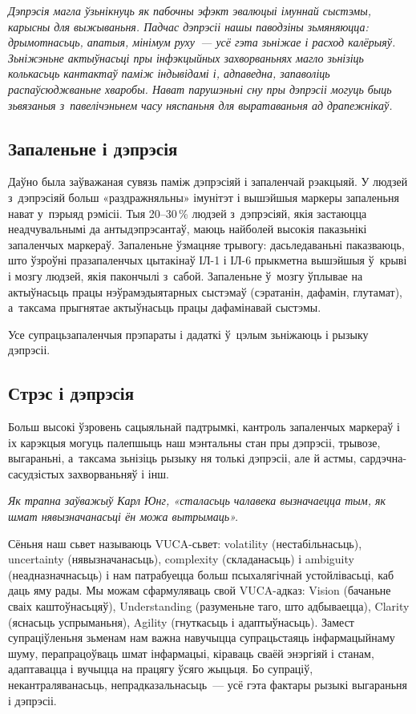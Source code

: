 \emph{Дэпрэсія магла ўзьнікнуць як пабочны эфэкт эвалюцыі імуннай сыстэмы, карысны для выжываньня. Падчас дэпрэсіі нашы паводзіны зьмяняюцца: дрымотнасьць, апатыя, мінімум руху~--- усё гэта зьніжае і расход калёрыяў. Зьніжэньне актыўнасьці пры інфэкцыйных захворваньнях магло зьнізіць колькасьць кантактаў паміж індывідамі і, адпаведна, запаволіць распаўсюджваньне хваробы. Нават парушэньні сну пры дэпрэсіі могуць быць зьвязаныя з~павелічэньнем часу няспаньня для выратаваньня ад драпежнікаў.}

\subsection*{Запаленьне і дэпрэсія}

Даўно была заўважаная сувязь паміж дэпрэсіяй і запаленчай рэакцыяй. У людзей з~дэпрэсіяй больш «раздражняльны» імунітэт і вышэйшыя маркеры запаленьня нават у~пэрыяд рэмісіі. Тыя 20--30\,\% людзей з~дэпрэсіяй, якія застаюцца неадчувальнымі да антыдэпрэсантаў, маюць найболей высокія паказьнікі запаленчых маркераў. Запаленьне ўзмацняе трывогу: дасьледаваньні паказваюць, што ўзроўні празапаленчых цытакінаў ІЛ-1 і ІЛ-6 прыкметна вышэйшыя ў~крыві і мозгу людзей, якія пакончылі з~сабой. Запаленьне ў~мозгу ўплывае на актыўнасьць працы нэўрамэдыятарных сыстэмаў (сэратанін, дафамін, глутамат), а~таксама прыгнятае актыўнасьць працы дафамінавай сыстэмы. 

Усе супрацьзапаленчыя прэпараты і дадаткі ў~цэлым зьніжаюць і рызыку дэпрэсіі.

\subsection*{Стрэс і дэпрэсія}

Больш высокі ўзровень сацыяльнай падтрымкі, кантроль запаленчых маркераў і іх карэкцыя могуць палепшыць наш мэнтальны стан пры дэпрэсіі, трывозе, выгараньні, а~таксама зьнізіць рызыку ня толькі дэпрэсіі, але й астмы, сардэчна-сасудзістых захворваньняў і інш.

\emph{Як трапна заўважыў Карл Юнг, «сталасьць чалавека вызначаецца тым, як шмат нявызначанасьці ён можа вытрымаць».}

Сёньня наш сьвет называюць VUCA-сьвет: volatility (нестабільнасьць), uncertainty (нявызначанасьць), complexity (складанасьць) і ambiguity (неадназначнасьць) і нам патрабуецца больш псыхалягічнай устойлівасьці, каб даць яму рады. Мы можам сфармуляваць свой VUCA-адказ: Vision (бачаньне сваіх каштоўнасьцяў), Understanding (разуменьне таго, што адбываецца), Clarity (яснасьць успрыманьня), Agility (гнуткасьць і адаптыўнасьць). Замест супраціўленьня зьменам нам важна навучыцца супрацьстаяць інфармацыйнаму шуму, перапрацоўваць шмат інфармацыі, кіраваць сваёй энэргіяй і станам, адаптавацца і вучыцца на працягу ўсяго жыцьця. Бо супраціў, некантраляванасьць, непрадказальнасьць~--- усё гэта фактары рызыкі выгараньня і дэпрэсіі.

